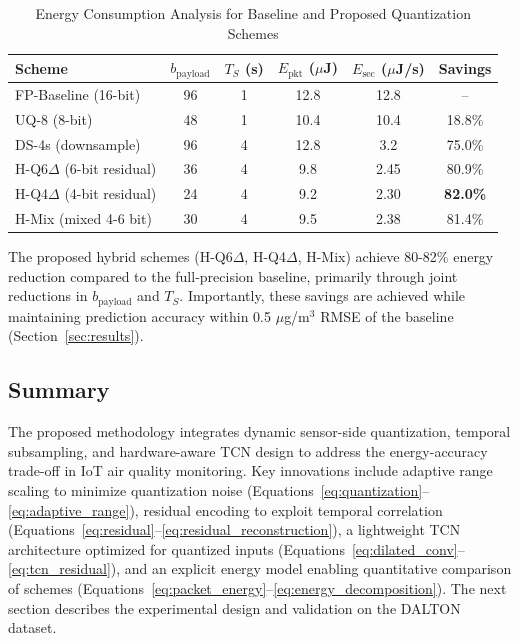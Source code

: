 \begin{table}[t]
\centering
\caption{Energy Consumption Analysis for Baseline and Proposed Quantization Schemes}
\label{tab:energy_comparison}
\begin{tabular}{lccccc}
\toprule
\textbf{Scheme} & $b_{\text{payload}}$ & $T_S$ (s) & $E_{\text{pkt}}$ ($\mu$J) & $E_{\text{sec}}$ ($\mu$J/s) & \textbf{Savings} \\
\midrule
FP-Baseline (16-bit) & 96 & 1 & 12.8 & 12.8 & -- \\
UQ-8 (8-bit) & 48 & 1 & 10.4 & 10.4 & 18.8\% \\
DS-4s (downsample) & 96 & 4 & 12.8 & 3.2 & 75.0\% \\
H-Q6$\Delta$ (6-bit residual) & 36 & 4 & 9.8 & 2.45 & 80.9\% \\
H-Q4$\Delta$ (4-bit residual) & 24 & 4 & 9.2 & 2.30 & \textbf{82.0\%} \\
H-Mix (mixed 4-6 bit) & 30 & 4 & 9.5 & 2.38 & 81.4\% \\
\bottomrule
\end{tabular}
\end{table}

The proposed hybrid schemes (H-Q6$\Delta$, H-Q4$\Delta$, H-Mix) achieve 80-82\% energy reduction compared to the full-precision baseline, primarily through joint reductions in $b_{\text{payload}}$ and $T_S$. Importantly, these savings are achieved while maintaining prediction accuracy within 0.5 $\mu$g/m$^3$ RMSE of the baseline (Section~\ref{sec:results}).

\subsection{Summary}

The proposed methodology integrates dynamic sensor-side quantization, temporal subsampling, and hardware-aware TCN design to address the energy-accuracy trade-off in IoT air quality monitoring. Key innovations include adaptive range scaling to minimize quantization noise (Equations~\eqref{eq:quantization}--\eqref{eq:adaptive_range}), residual encoding to exploit temporal correlation (Equations~\eqref{eq:residual}--\eqref{eq:residual_reconstruction}), a lightweight TCN architecture optimized for quantized inputs (Equations~\eqref{eq:dilated_conv}--\eqref{eq:tcn_residual}), and an explicit energy model enabling quantitative comparison of schemes (Equations~\eqref{eq:packet_energy}--\eqref{eq:energy_decomposition}). The next section describes the experimental design and validation on the DALTON dataset.
